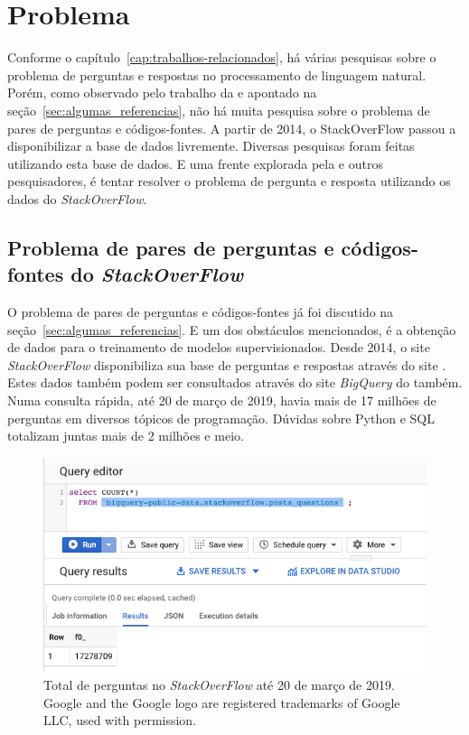 \chapter{Problema}
\label{cap:problema}

Conforme o capítulo~\ref{cap:trabalhos-relacionados}, há várias pesquisas sobre o problema de perguntas e respostas no processamento de linguagem natural. Porém, como observado pelo trabalho da \cite{yao-2018} e apontado na seção~\ref{sec:algumas_referencias}, não há muita pesquisa sobre o problema de pares de perguntas e códigos-fontes. A partir de 2014, o StackOverFlow passou a disponibilizar a base de dados livremente. Diversas pesquisas foram feitas utilizando esta base de dados. E uma frente explorada pela \cite{yao-2018} e outros pesquisadores, é tentar resolver o problema de pergunta e resposta utilizando os dados do \textit{StackOverFlow}.

\section{Problema de pares de perguntas e códigos-fontes do \textit{StackOverFlow}}

O problema de pares de perguntas e códigos-fontes já foi discutido na seção~\ref{sec:algumas_referencias}. E um dos obstáculos mencionados, é a obtenção de dados para o treinamento de modelos supervisionados. Desde 2014, o site \textit{StackOverFlow} disponibiliza sua base de perguntas e respostas através do site \cite{sof-2019}. Estes dados também podem ser consultados através do site \textit{BigQuery} do \cite{bigquery-2019} também. Numa consulta rápida, até 20 de março de 2019, havia mais de 17 milhões de perguntas em diversos tópicos de programação. Dúvidas sobre Python e SQL totalizam juntas mais de 2 milhões e meio.

\begin{figure}[h]
\includegraphics[width=12cm]{src/figuras/cap-problema/post-questions-total.png}
\caption{Total de perguntas no \textit{StackOverFlow} até 20 de março de 2019. Google and the Google logo are registered trademarks of Google LLC, used with permission.}
\label{fig:bigquery-total-questions-stackoverflow}
\end{figure}

